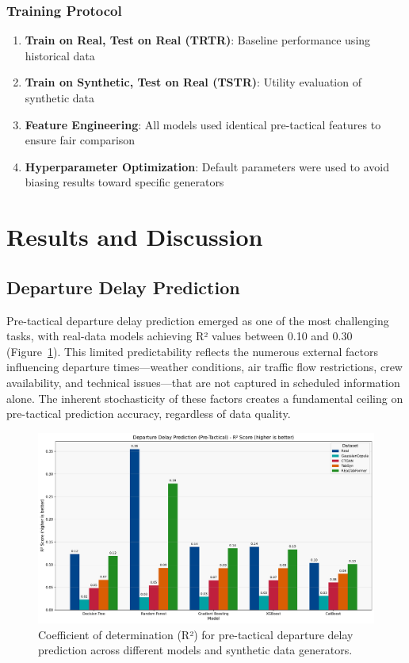 \documentclass[conference]{IEEEtran}
\begin{document}
\subsubsection{Training Protocol}
\begin{enumerate}
    \item \textbf{Train on Real, Test on Real (TRTR)}: Baseline performance using historical data
    \item \textbf{Train on Synthetic, Test on Real (TSTR)}: Utility evaluation of synthetic data
    \item \textbf{Feature Engineering}: All models used identical pre-tactical features to ensure fair comparison
    \item \textbf{Hyperparameter Optimization}: Default parameters were used to avoid biasing results toward specific generators
\end{enumerate}


\section{Results and Discussion}

\subsection{Departure Delay Prediction}

Pre-tactical departure delay prediction emerged as one of the most challenging tasks, with real-data models achieving R² values between 0.10 and 0.30 (Figure~\ref{fig:departure_r2}). This limited predictability reflects the numerous external factors influencing departure times—weather conditions, air traffic flow restrictions, crew availability, and technical issues—that are not captured in scheduled information alone. The inherent stochasticity of these factors creates a fundamental ceiling on pre-tactical prediction accuracy, regardless of data quality.

\begin{figure}[htbp]
    \centering
    \includegraphics[width=\linewidth]{plots/departure_delay_min_pre-tactical/departure_delay_min_pre-tactical_r2.pdf}
    \caption{Coefficient of determination (R²) for pre-tactical departure delay prediction across different models and synthetic data generators.}
    \label{fig:departure_r2}
\end{figure}
\end{document}
